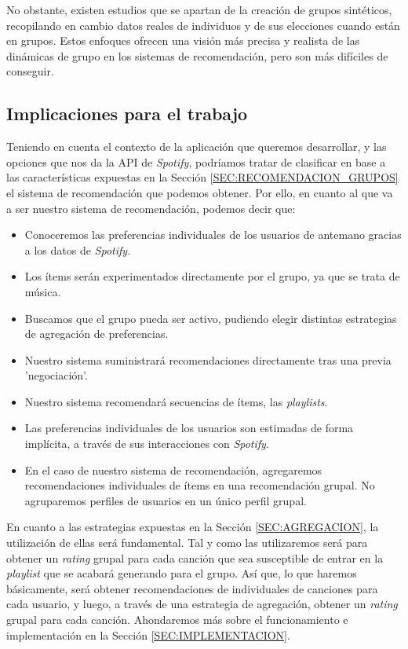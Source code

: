 No obstante, existen estudios que se apartan de la creación de grupos sintéticos, recopilando en cambio datos reales de individuos y de sus elecciones cuando 
están en grupos. Estos enfoques ofrecen una visión más precisa y realista de las dinámicas de grupo en los sistemas de recomendación, pero son más difíciles de
conseguir.


\subsection{Implicaciones para el trabajo\label{SEC:DISCUSION_RECOMENDACION}}

Teniendo en cuenta el contexto de la aplicación que queremos desarrollar, y las opciones que nos da la API de \textit{Spotify}, podríamos tratar 
de clasificar en base a las características expuestas en la Sección \ref{SEC:RECOMENDACION_GRUPOS} el sistema de recomendación que podemos obtener. 
Por ello, en cuanto al que va a ser nuestro sistema de recomendación, podemos decir que:
\begin{itemize}
    \item Conoceremos las preferencias individuales de los usuarios de antemano gracias a los datos de \textit{Spotify}.
    \item Los ítems serán experimentados directamente por el grupo, ya que se trata de música.
    \item Buscamos que el grupo pueda ser activo, pudiendo elegir distintas estrategias de agregación de preferencias.
    \item Nuestro sistema suministrará recomendaciones directamente tras una previa 'negociación'.
    \item Nuestro sistema recomendará secuencias de ítems, las \textit{playlists}.
    \item Las preferencias individuales de los usuarios son estimadas de forma implícita, a través de sus interacciones con \textit{Spotify}.
    \item En el caso de nuestro sistema de recomendación, agregaremos recomendaciones individuales de ítems en una recomendación grupal. No agruparemos
    perfiles de usuarios en un único perfil grupal.
\end{itemize}

En cuanto a las estrategias expuestas en la Sección \ref{SEC:AGREGACION}, la utilización de ellas será fundamental. Tal y como las utilizaremos será para obtener
un \textit{rating} grupal para cada canción que sea susceptible de entrar en la \textit{playlist} que se acabará generando para el grupo. Así que, lo que haremos
básicamente, será obtener recomendaciones de individuales de canciones para cada usuario, y luego, a través de una estrategia de agregación, obtener un 
\textit{rating} grupal para cada canción. Ahondaremos más sobre el funcionamiento e implementación en la Sección \ref{SEC:IMPLEMENTACION}.